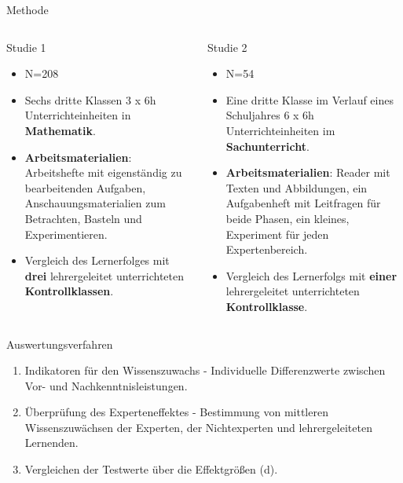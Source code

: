 \begin{block}{Methode}
\begin{columns}[t,totalwidth=\twocolwid]

\begin{column}{\onecolwid}\vspace{-.6in}
\centering Studie 1
\linebreak
\begin{itemize}
\justifying
\item N=208
\item Sechs dritte Klassen 3 x 6h Unterrichteinheiten in \textbf{Mathematik}.
\item \textbf{Arbeitsmaterialien}: Arbeitshefte mit eigenständig zu bearbeitenden Aufgaben, Anschauungsmaterialien zum Betrachten, Basteln und Experimentieren.
\item Vergleich des Lernerfolges  mit \textbf{drei} lehrergeleitet unterrichteten \textbf{Kontrollklassen}.
\end{itemize}
\end{column}

\begin{column}{\onecolwid}\vspace{-.6in}
\centering Studie 2
\linebreak
\begin{itemize}
\justifying
\item N=54
\item Eine dritte Klasse im Verlauf  eines Schuljahres 6 x 6h Unterrichteinheiten im \textbf{Sachunterricht}.
\item \textbf{Arbeitsmaterialien}: Reader mit Texten und Abbildungen, ein Aufgabenheft mit Leitfragen für beide Phasen, ein kleines, Experiment für jeden Expertenbereich.
\item Vergleich des Lernerfolgs mit \textbf{einer} lehrergeleitet unterrichteten \textbf{Kontrollklasse}.
\end{itemize}
\end{column}

\end{columns}
\end{block}

\begin{block}{Auswertungsverfahren}
\begin{enumerate}
\item Indikatoren für den Wissenszuwachs - Individuelle Differenzwerte zwischen Vor- und Nachkenntnisleistungen.
\item Überprüfung des Experteneffektes - Bestimmung von mittleren Wissenszuwächsen der Experten, der Nichtexperten und lehrergeleiteten Lernenden.
\item Vergleichen der Testwerte über die Effektgrößen (d).
\end{enumerate}
\end{block} 

